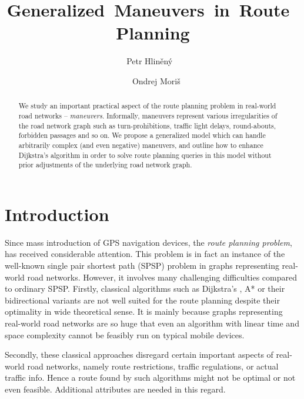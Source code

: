 \documentclass[envcountsect,envcountsame]{llncs}
\begin{document}
\title{\mbox{Generalized Maneuvers in Route Planning}}
\author{Petr Hlin\v{e}n\'y ~\and~ Ondrej Mori\v{s}}


\maketitle

\begin{abstract}
We study an important practical aspect of the route planning problem in 
real-world road networks -- \emph{maneuvers}. Informally, maneuvers 
represent various irregularities of the road network graph such as
turn-prohibitions, traffic light delays, round-abouts, forbidden passages 
and so on. We propose a generalized model which can handle arbitrarily complex
(and even negative) maneuvers, and outline how to enhance Dijkstra's 
algorithm in order to solve route planning queries in this model without 
prior adjustments of the underlying road network graph.
\end{abstract}

\section{Introduction}

Since mass introduction of GPS navigation devices, the \emph{route planning 
problem}, has received considerable attention. This problem is in fact
an instance of the well-known single pair shortest path (SPSP) problem
in graphs representing real-world road networks. However, it involves 
many challenging difficulties compared to ordinary SPSP. Firstly, classical 
algorithms such as Dijkstra's \cite{Dijkstra1959}, A* \cite{Hart1972} or their 
bidirectional variants \cite{Pohl1969} are not well suited for the route
planning despite their optimality in wide theoretical sense. It is mainly 
because graphs representing real-world road networks are so huge that even 
an algorithm with linear time and space complexity cannot be feasibly run 
on typical mobile devices. 

Secondly, these classical approaches disregard certain important aspects of
real-world road networks, namely route restrictions, traffic regulations, or
actual traffic info. Hence a route found by such algorithms might not be 
optimal or not even feasible. Additional attributes are needed in this regard.
\end{document}
